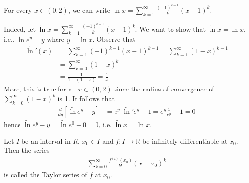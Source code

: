 \documentclass{tufte-handout}
\begin{document}
\begin{Example}
For every \( x \in (0,2) \), we can write \( 
\ln x = \sum_{k=1}^{\infty} \frac{(-1)^{k-1}}{k}(x-1)^k \).
\end{Example}
Indeed, let \(\tilde{\ln} x = \sum_{k=1}^{\infty} \frac{(-1)^{k-1}}{k}(x-1)^k\).
We want to show that \( \tilde{\ln} x = \ln x \), i.e., 
\(\tilde{\ln} e^y = y\) where \( y = \ln x \).
Observe that 
\begin{align}
    \tilde{\ln}' (x) &= \sum_{k=1}^{\infty} (-1)^{k-1}(x-1)^{k-1} 
    = \sum_{k=1}^{\infty} (1-x)^{k-1}\\
    &= \sum_{k=0}^{\infty}(1-x)^{k} \\
    &= \frac{1}{1-(1-x)} 
    = \frac{1}{x}
\end{align}
More, this is true for all \( x \in (0,2) \) 
since the radius of convergence of \(\sum_{k=0}^{\infty}(1-x)^k\) is 1.
It follows that 
\begin{align}
    \frac{d}{dy}[\tilde{\ln} e^y - y] &= e^y\;\tilde{\ln}' e^y -1 = e^y\frac{1}{e^y} -1 = 0
\end{align}
hence \( \tilde{\ln} e^y - y = \tilde{\ln} e^0 - 0 = 0 \), 
i.e. \( \tilde{\ln} x = \ln x \).
\hfill\qedsymbol

\begin{Definition}
    Let \( I \) be an interval in \( R \), \( x_0 \in I \)
    and \( f: I \to \mathbb{R} \) be infinitely differentiable
    at \( x_0 \). Then the series 
    \begin{align}
        \sum_{k=0}^{\infty}\frac{f^{(k)}(x_0)}{k!}(x-x_0)^k
    \end{align}
    is called the Taylor series of \( f \) at \( x_0 \).
\end{Definition}
\end{document}
